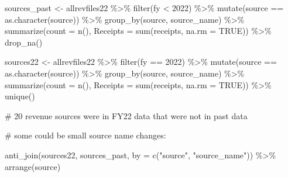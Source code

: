 \documentclass[
  letterpaper,
  DIV=11,
  numbers=noendperiod]{scrreport}
\newenvironment{Shaded}{\begin{snugshade}}{\end{snugshade}}
\newcommand{\AttributeTok}[1]{\textcolor[rgb]{0.40,0.45,0.13}{#1}}
\newcommand{\CommentTok}[1]{\textcolor[rgb]{0.37,0.37,0.37}{#1}}
\newcommand{\ConstantTok}[1]{\textcolor[rgb]{0.56,0.35,0.01}{#1}}
\newcommand{\DecValTok}[1]{\textcolor[rgb]{0.68,0.00,0.00}{#1}}
\newcommand{\FunctionTok}[1]{\textcolor[rgb]{0.28,0.35,0.67}{#1}}
\newcommand{\NormalTok}[1]{\textcolor[rgb]{0.00,0.23,0.31}{#1}}
\newcommand{\OtherTok}[1]{\textcolor[rgb]{0.00,0.23,0.31}{#1}}
\newcommand{\SpecialCharTok}[1]{\textcolor[rgb]{0.37,0.37,0.37}{#1}}
\newcommand{\StringTok}[1]{\textcolor[rgb]{0.13,0.47,0.30}{#1}}
\begin{document}
\begin{Shaded}
\begin{Highlighting}[]
\NormalTok{sources\_past }\OtherTok{\textless{}{-}}\NormalTok{ allrevfiles22  }\SpecialCharTok{\%\textgreater{}\%} 
  \FunctionTok{filter}\NormalTok{(fy }\SpecialCharTok{\textless{}} \DecValTok{2022}\NormalTok{) }\SpecialCharTok{\%\textgreater{}\%} 
  \FunctionTok{mutate}\NormalTok{(source }\SpecialCharTok{==} \FunctionTok{as.character}\NormalTok{(source)) }\SpecialCharTok{\%\textgreater{}\%} 
  \FunctionTok{group\_by}\NormalTok{(source, source\_name) }\SpecialCharTok{\%\textgreater{}\%} 
  \FunctionTok{summarize}\NormalTok{(}\AttributeTok{count =} \FunctionTok{n}\NormalTok{(), }\AttributeTok{Receipts =} \FunctionTok{sum}\NormalTok{(receipts, }\AttributeTok{na.rm =} \ConstantTok{TRUE}\NormalTok{))  }\SpecialCharTok{\%\textgreater{}\%} 
  \FunctionTok{drop\_na}\NormalTok{()}

\NormalTok{sources22 }\OtherTok{\textless{}{-}}\NormalTok{ allrevfiles22  }\SpecialCharTok{\%\textgreater{}\%} 
  \FunctionTok{filter}\NormalTok{(fy }\SpecialCharTok{==} \DecValTok{2022}\NormalTok{) }\SpecialCharTok{\%\textgreater{}\%} 
  \FunctionTok{mutate}\NormalTok{(source }\SpecialCharTok{==} \FunctionTok{as.character}\NormalTok{(source)) }\SpecialCharTok{\%\textgreater{}\%} 
  \FunctionTok{group\_by}\NormalTok{(source, source\_name) }\SpecialCharTok{\%\textgreater{}\%}  
  \FunctionTok{summarize}\NormalTok{(}\AttributeTok{count =} \FunctionTok{n}\NormalTok{(), }\AttributeTok{Receipts =} \FunctionTok{sum}\NormalTok{(receipts, }\AttributeTok{na.rm =} \ConstantTok{TRUE}\NormalTok{)) }\SpecialCharTok{\%\textgreater{}\%} 
  \FunctionTok{unique}\NormalTok{()}

\CommentTok{\# 20 revenue sources were in FY22 data that were not in past data }

\CommentTok{\# some could be small source name changes:}

\FunctionTok{anti\_join}\NormalTok{(sources22, sources\_past, }\AttributeTok{by =} \FunctionTok{c}\NormalTok{(}\StringTok{"source"}\NormalTok{, }\StringTok{"source\_name"}\NormalTok{)) }\SpecialCharTok{\%\textgreater{}\%} \FunctionTok{arrange}\NormalTok{(source)}
\end{Highlighting}
\end{Shaded}
\end{document}

